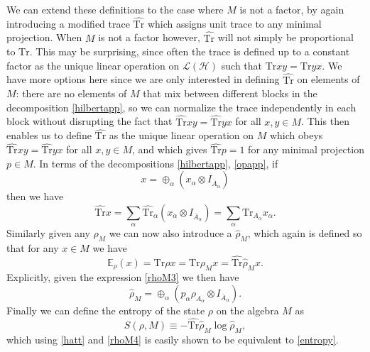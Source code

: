 \documentclass[12pt]{article}
\newcommand{\be}{\begin{equation}}
\newcommand{\ee}{\end{equation}}
\newcommand{\Tr}{\mathrm{Tr}}
\newcommand{\Ll}{\mathcal{L}}
\newcommand{\Hh}{\mathcal{H}}
\newcommand{\Ab}{\ol{A}}
\newcommand{\LH}{\Ll(\Hh)}
\newcommand{\ol}{\overline}
\begin{document}
We can extend these definitions to the case where $M$ is not a factor, by again introducing a modified trace $\hat{\Tr}$ which assigns unit trace to any minimal projection.  When $M$ is not a factor however, $\hat{\Tr}$ will not simply be proportional to $\Tr$.  This may be surprising, since often the trace is defined up to a constant factor as the unique linear operation on $\LH$ such that $\Tr xy=\Tr yx$.  We have more options here since we are only interested in defining $\hat{\Tr}$ on elements of $M$: there are no elements of $M$ that mix between different blocks in the decomposition \eqref{hilbertapp}, so we can normalize the trace independently in each block without disrupting the fact that $\hat{\Tr} xy=\hat{\Tr} yx$ for all $x,y\in M$.  This then enables us to define $\hat{\Tr}$ as the unique linear operation on $M$ which obeys  $\hat{\Tr} xy=\hat{\Tr} yx$ for all $x,y\in M$, and which gives $\hat{\Tr} p=1$ for any minimal projection $p\in M$.  In terms of the decompositions \eqref{hilbertapp}, \eqref{opapp}, if 
\be
x=\oplus_\alpha \left(x_\alpha\otimes I_{\Ab_\alpha}\right)
\ee
then we have
\be\label{hatt}
\hat{\Tr} x=\sum_\alpha \hat{\Tr}_\alpha \left(x_\alpha\otimes I_{\Ab_\alpha}\right)=\sum_\alpha \Tr_{A_\alpha} x_\alpha.
\ee
Similarly given any $\rho_M$ we can now also introduce a $\hat{\rho}_M$, which again is defined so that for any $x\in M$ we have
\be
\mathbb{E}_\rho(x)=\Tr \rho x=\Tr\rho_M x=\hat{\Tr}\hat{\rho}_M x.
\ee
Explicitly, given the expression \eqref{rhoM3} we then have
\be\label{rhoM4}
\hat{\rho}_M=\oplus_\alpha \left(p_\alpha \rho_{A_\alpha}\otimes I_{\Ab_\alpha}\right).
\ee
Finally we can define the entropy of the state $\rho$ on the algebra $M$ as
\be
S(\rho,M)\equiv -\hat{\Tr}\hat{\rho}_M\log \hat{\rho}_M,
\ee
which using \eqref{hatt} and \eqref{rhoM4} is easily shown to be equivalent to \eqref{entropy}.
\end{document}
